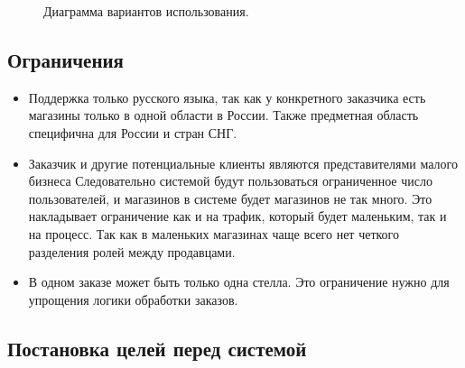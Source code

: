 \documentclass[a4paper,article,14pt]{extarticle}
\begin{document}
\begin{figure}[ht]
\begin{center}
\caption{\label{uml2} Диаграмма вариантов использования.}
\end {center}
\end {figure}
    
\subsection{Ограничения}

\begin{itemize}
    \item Поддержка только русского языка, так как у конкретного заказчика есть магазины только в одной области в России.
    Также предметная область специфична для России и стран СНГ.
    \item Заказчик и другие потенциальные клиенты являются представителями малого бизнеса
    Следовательно системой будут пользоваться ограниченное число пользователей, и магазинов в системе будет магазинов не так много.
    Это накладывает ограничение как и на трафик, который будет маленьким, так и на процесс.
    Так как в маленьких магазинах чаще всего нет четкого разделения ролей между продавцами.
    \item В одном заказе может быть только одна стелла. Это ограничение нужно для упрощения логики обработки заказов.
\end{itemize}

\subsection{Постановка целей перед системой}
\end{document}
